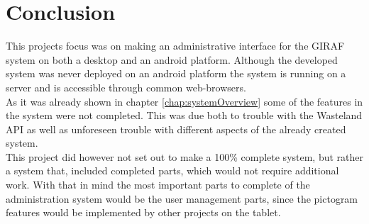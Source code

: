 \chapter{Conclusion}
\label{chap:conclusion}
This projects focus was on making an administrative interface for the GIRAF system on both a desktop and an android platform. Although the developed system was never deployed on an android platform the system is running on a server and is accessible through common web-browsers.\\
As it was already shown in chapter \vref{chap:systemOverview} some of the features in the system were not completed. This was due both to trouble with the Wasteland API as well as unforeseen trouble with different aspects of the already created system.\\
This project did however not set out to make a 100\% complete system, but rather a system that, included completed parts, which would not require additional work. With that in mind the most important parts to complete of the administration system would be the user management parts, since the pictogram features would be implemented by other projects on the tablet.\\
